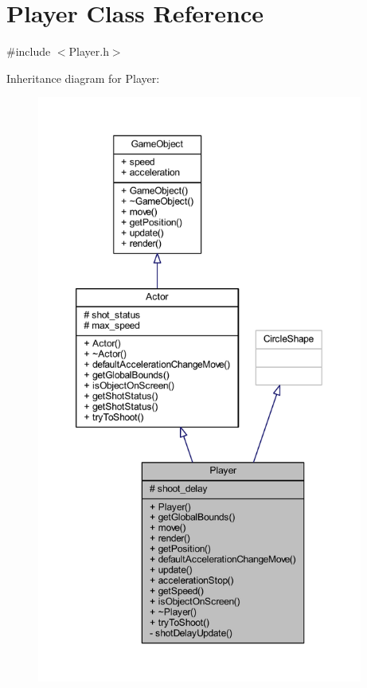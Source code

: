 \hypertarget{class_player}{}\section{Player Class Reference}
\label{class_player}


{\ttfamily \#include $<$Player.\+h$>$}



Inheritance diagram for Player\+:\nopagebreak
\begin{figure}[H]
\begin{center}
\leavevmode
\includegraphics[height=550pt]{class_player__inherit__graph}
\end{center}
\end{figure}


